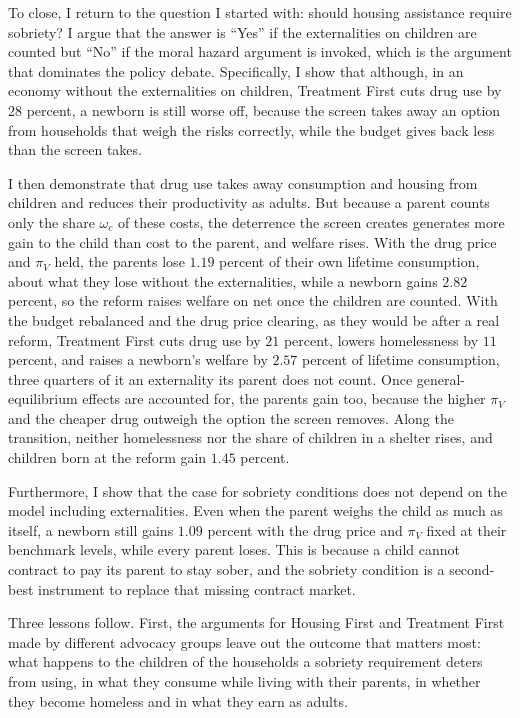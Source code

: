 \documentclass[10pt]{article}
\newif\ifshowupdates \showupdatesfalse
\newcommand{\updnum}[1]{\ifshowupdates{\color{blue}#1}\else#1\fi}
\begin{document}
To close, I return to the question I started with: should housing assistance require sobriety?   I argue that the answer is  ``Yes'' if the externalities on children are counted but ``No'' if the moral hazard argument is invoked, which is the argument that dominates the policy debate.   Specifically, I show that although, in an economy without the externalities on children, Treatment First cuts drug use by $28$ percent, a newborn is still worse off, because the screen takes away an option from households that weigh the risks correctly, while the budget gives back less than the screen takes.

 I  then demonstrate that drug use takes away consumption and housing from children and reduces their productivity as adults.  But because a parent counts only the share $\omega_c$ of these costs, the deterrence the screen creates generates more gain to the child than cost to the parent, and welfare rises. With the drug price and $\pi_V$ held, the parents lose $1.19$ percent of their own lifetime consumption, about what they lose without the externalities, while a newborn gains $2.82$ percent, so the reform raises welfare on net once the children are counted. With the budget rebalanced and the drug price clearing, as they would be after a real reform, Treatment First cuts drug use by $21$ percent, lowers homelessness by $11$ percent, and raises a newborn's welfare by $2.57$ percent of lifetime consumption, three quarters of it an externality its parent does not count. Once general-equilibrium effects are accounted for, the parents gain too, because the higher $\pi_V$ and the cheaper drug outweigh the option the screen removes. Along the transition, neither homelessness nor the share of children in a shelter rises, and children born at the reform gain \updnum{$1.45$} percent.

 Furthermore, I show that the case for sobriety conditions does not  depend on the  model including externalities.  Even when the parent weighs the child  as much as itself, a newborn still gains $1.09$ percent with the drug price and $\pi_V$  fixed at their benchmark levels, while every parent loses.  This is because a child cannot contract to pay its parent to  stay sober, and the sobriety condition  is a second-best instrument to replace that missing contract  market.

Three lessons follow. First, the arguments for Housing First and Treatment First made by different advocacy
groups leave out the outcome that matters most: what happens to the children of the households a sobriety requirement deters from using, in what they consume while living with their parents, in whether they become homeless and in what they earn as adults.
\end{document}
